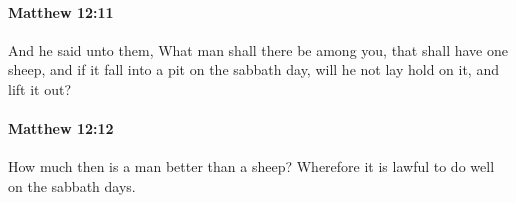 		\paragraph{Matthew 12:11} %
			\label{MATTHEW-12-11}

			And he said unto them, What man shall there be among you, that shall have one sheep, and if it fall into a pit on the sabbath day, will he not lay hold on it, and lift it out?

			\begin{framed}
			\scriptsize
				\begin{compactdesc}
					\item[SBLG] 
				\end{compactdesc}
			\end{framed}

		\paragraph{Matthew 12:12} %
			\label{MATTHEW-12-12}

			How much then is a man better than a sheep? Wherefore it is lawful to do well on the sabbath days.


